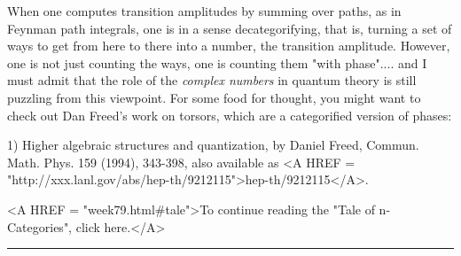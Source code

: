When one computes transition amplitudes by summing over paths, as in
Feynman path integrals, one is in a sense decategorifying, that is,
turning a set of ways to get from here to there into a number, the
transition amplitude.  However, one is not just counting the ways, one
is counting them "with phase".... and I must admit that the
role of the \emph{complex numbers} in quantum theory is still puzzling
from this viewpoint.  For some food for thought, you might want to check
out Dan Freed's work on torsors, which are a categorified version of
phases:

1) Higher algebraic structures and quantization, by Daniel Freed,
Commun. Math. Phys. 159 (1994), 343-398, also available as
<A HREF = "http://xxx.lanl.gov/abs/hep-th/9212115">hep-th/9212115</A>. 





<A HREF = "week79.html#tale">To continue reading the "Tale of
n-Categories", click here.</A>


\par\noindent\rule{\textwidth}{0.4pt}
